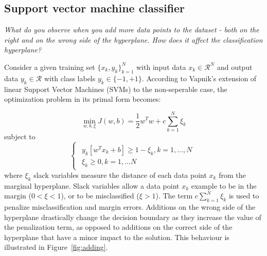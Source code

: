 \documentclass{article}
\begin{document}
\subsection{Support vector machine classifier}

\textit{What do you observe when you add more data points to the dataset - both
on the right and on the wrong side of the hyperplane. How does it affect the
classification hyperplane?}

Consider a given training set $\{x_k,y_k\}^N_{k=1}$ with input data $x_k \in \mathcal{R}^N $ and output data $y_k \in \mathcal{R} $ with class labels $y_k \in \{-1,+1 \}$. According to Vapnik's extension of linear Support Vector Machines (SVMs) to the non-seperable case, the optimization problem in its primal form becomes:

\begin{equation}
\min\limits_{w,b,\xi} J(w,b) = \frac{1}{2}w^Tw + c \sum_{k=1}^{N}\xi_k
\end{equation}
subject to
\begin{equation*}
\begin{cases}
\begin{aligned}
  y_k[w^Tx_k+b] \geq 1-\xi_k, k=1,...,N \\
  \xi_k \geq 0, k =1,...N
\end{aligned}
\end{cases}
\end{equation*}
where $\xi_k$ slack variables measure the distance of each data point $x_k$ from the marginal hyperplane. Slack variables allow a data point $x_k$ example to be in the margin ($0< \xi<1$), or to be misclassified ($\xi>1$).
The term $c \sum_{k=1}^{N}\xi_k$ is used to penalize misclassification and margin errors. Additions on the wrong side of the hyperplane drastically change the decision boundary as they increase the value of the penalization term, as opposed to additions on the correct side of the hyperplane that have a minor impact to the solution. This behaviour is illustrated in Figure~\ref{fig:adding}. 
\end{document}
